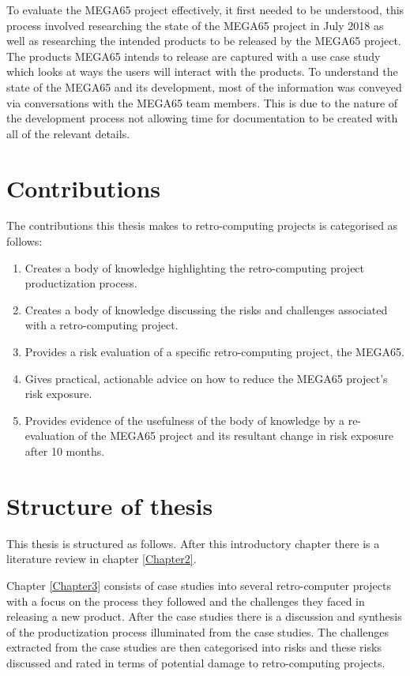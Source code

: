 To evaluate the MEGA65 project effectively, it first needed to be understood, this process involved researching the state of the MEGA65 project in July 2018 as well as researching the intended products to be released by the MEGA65 project. The products MEGA65 intends to release are captured with a use case study which looks at ways the users will interact with the products. To understand the state of the MEGA65 and its development, most of the information was conveyed via conversations with the MEGA65 team members. This is due to the nature of the development process not allowing time for documentation to be created with all of the relevant details. 

\section{Contributions}
The contributions this thesis makes to retro-computing projects is categorised as follows:
\begin{enumerate}
\item Creates a body of knowledge highlighting the retro-computing project productization process.
\item Creates a body of knowledge discussing the risks and challenges associated with a retro-computing project.
\item Provides a risk evaluation of a specific retro-computing project, the MEGA65.
\item Gives practical, actionable advice on how to reduce the MEGA65 project's risk exposure.
\item Provides evidence of the usefulness of the body of knowledge by a re-evaluation of the MEGA65 project and its resultant change in risk exposure after 10 months.
\end{enumerate}

\section{Structure of thesis}
This thesis is structured as follows. After this introductory chapter there is a literature review in chapter \ref{Chapter2}. 

Chapter \ref{Chapter3} consists of case studies into several retro-computer projects with a focus on the process they followed and the challenges they faced in releasing a new product. After the case studies there is a discussion and synthesis of the productization process illuminated from the case studies. The challenges extracted from the case studies are then categorised into risks and these risks discussed and rated in terms of potential damage to retro-computing projects. 

